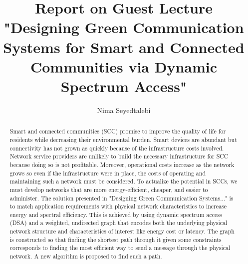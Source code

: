 \documentclass[]{article}
\title{Report on Guest Lecture "Designing Green Communication Systems for Smart and Connected Communities via Dynamic Spectrum Access"}
\author{Nima Seyedtalebi}
\begin{document}
\maketitle

\begin{abstract}
Smart and connected communities (SCC) promise to improve the quality of life for residents while decreasing their environmental burden. Smart devices are abundant  but connectivity has not grown as quickly because of the infrastructure costs involved. Network service providers are unlikely to build the necessary infrastructure for SCC because doing so is not profitable. Moreover, operational costs increase as the network grows so even if the infrastructure were in place, the costs of operating and maintaining such a network must be considered. To actualize the potential in SCCs, we must develop networks that are more energy-efficient, cheaper, and easier to administer. The solution presented in "Designing Green Communication Systems..." is to match application requirements with physical network characteristics to increase energy and spectral efficiency. This is achieved by using dynamic spectrum access (DSA) and a weighted, undirected graph that encodes both the underlying physical network structure and characteristics of interest like energy cost or latency. The graph is constructed so that finding the shortest path through it given some constraints corresponds to finding the most efficient way to send a message through the physical network. A new algorithm is proposed to find such a path.
\end{abstract}
\end{document}
